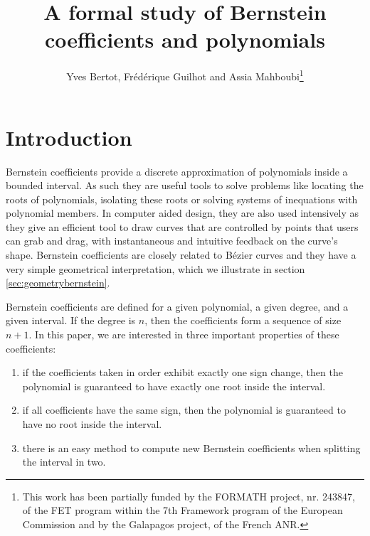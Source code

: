 \documentclass{mscs}
\begin{document}
\title{A formal study of Bernstein coefficients and polynomials}
\author[Y. Bertot, F. Guilhot and A. Mahboubi]{Yves Bertot,
  Fr\'ed\'erique Guilhot and Assia
  Mahboubi\thanks{This work has been partially funded by the FORMATH
    project, nr. 243847, of the FET program within the 7th Framework
    program of the European Commission and by the Galapagos project, of the
    French ANR.
}}


\newtheorem{lemma}{Lemma}[section]
\newtheorem{definition}{Definition}[section]
\newtheorem{theorem}{Theorem}[section]

\maketitle

\section{Introduction}
Bernstein coefficients provide a discrete approximation of polynomials
inside a bounded interval. As such they are useful tools to solve
problems like locating the roots of polynomials, isolating these roots
or solving systems of inequations with polynomial members.  In
computer aided design, they are also used intensively as they give an
efficient tool to draw curves that are controlled by points that users
can grab and drag, with instantaneous and intuitive feedback on the
curve's shape.  
Bernstein coefficients are closely related to B\'ezier curves
and they have a very simple geometrical interpretation, which we illustrate
in section \ref{sec:geometrybernstein}.

Bernstein coefficients are defined for a given polynomial, a given
degree, and a given interval. If the degree is \(n\), then
the coefficients form a sequence of size \(n+1\). In
this paper, we are interested in three important properties of these
coefficients:
\begin{enumerate}
\item if the coefficients taken in order exhibit exactly one sign change,
  then the polynomial is guaranteed to have exactly one root inside
  the interval.
\item  if all coefficients have the same sign, then the
  polynomial is guaranteed to have no root inside the interval.
\item there is an easy method to compute new Bernstein coefficients when
 splitting the interval in two.
\end{enumerate}
\end{document}
